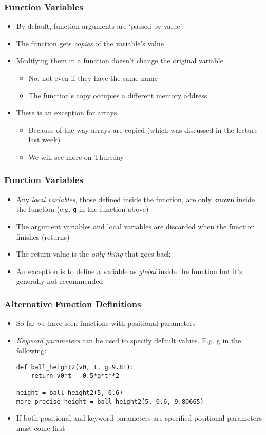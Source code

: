 \documentclass[english,14pt]{beamer}
\begin{document}
\begin{frame}
\frametitle{Function Variables}
\begin{itemize}
    \item By default, function arguments are `passed by value'
    \item The function gets \textit{copies} of the variable's value
      
    \item Modifying them in a function doesn't change the original variable
	\begin{itemize}
		\item No, not even if they have the same name
		\item The function's copy occupies a different memory address
	\end{itemize}
	 
	\item There is an exception for arrays 
		\begin{itemize}
		\item Because of the way arrays are copied (which was discussed in the lecture last week)
		\item We will see more on Thursday
	\end{itemize}
    \end{itemize}
\end{frame}

\begin{frame}
\frametitle{Function Variables}
\begin{itemize}
    \item Any \textit{local variables}, those defined inside the function, are only known inside the function (e.g. \texttt{g} in the function above)
    \item The argument variables and local variables are discarded when the function finishes (returns)
    \item The return value is the \textit{only thing} that goes back
    \item An exception is to define a variable as \textit{global} inside the function but it's generally not recommended
\end{itemize}
\end{frame}


\begin{frame}[fragile]
\frametitle{Alternative Function Definitions}
\begin{itemize}
\item So far we have seen functions with positional parameters
\item \textit{Keyword parameters} can be used to specify default values. E.g. g in the following:
\begin{lstlisting}[style=CStyle]
def ball_height2(v0, t, g=9.81):    
    return v0*t - 0.5*g*t**2      

height = ball_height2(5, 0.6)   
more_precise_height = ball_height2(5, 0.6, 9.80665)  
\end{lstlisting}
\item If both positional and keyword parameters are specified positional parameters must come first
\end{itemize}
\end{frame}
\end{document}
